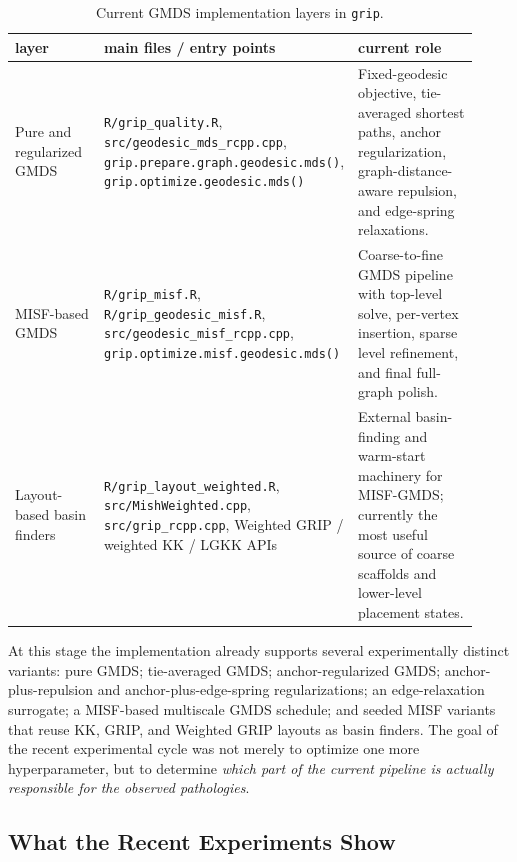 \documentclass[twoside,11pt]{article}
\begin{document}
\begin{table}[t]
  \centering
  \small
  \caption{Current GMDS implementation layers in \texttt{grip}.}
  \label{tab:implementation_layers}
  \begin{tabular}{p{0.23\linewidth} p{0.34\linewidth} p{0.35\linewidth}}
    \toprule
    layer & main files / entry points & current role \\
    \midrule
    Pure and regularized GMDS &
    \texttt{R/grip\_quality.R},
    \texttt{src/geodesic\_mds\_rcpp.cpp},
    \texttt{grip.prepare.graph.geodesic.mds()},
    \texttt{grip.optimize.geodesic.mds()} &
    Fixed-geodesic objective, tie-averaged shortest paths, anchor regularization, graph-distance-aware repulsion, and edge-spring relaxations. \\
    \addlinespace
    MISF-based GMDS &
    \texttt{R/grip\_misf.R},
    \texttt{R/grip\_geodesic\_misf.R},
    \texttt{src/geodesic\_misf\_rcpp.cpp},
    \texttt{grip.optimize.misf.geodesic.mds()} &
    Coarse-to-fine GMDS pipeline with top-level solve, per-vertex insertion, sparse level refinement, and final full-graph polish. \\
    \addlinespace
    Layout-based basin finders &
    \texttt{R/grip\_layout\_weighted.R},
    \texttt{src/MishWeighted.cpp},
    \texttt{src/grip\_rcpp.cpp},
    Weighted GRIP / weighted KK / LGKK APIs &
    External basin-finding and warm-start machinery for MISF-GMDS; currently the most useful source of coarse scaffolds and lower-level placement states. \\
    \bottomrule
  \end{tabular}
\end{table}

At this stage the implementation already supports several experimentally
distinct variants: pure GMDS; tie-averaged GMDS; anchor-regularized GMDS;
anchor-plus-repulsion and anchor-plus-edge-spring regularizations; an
edge-relaxation surrogate; a MISF-based multiscale GMDS schedule; and seeded
MISF variants that reuse KK, GRIP, and Weighted GRIP layouts as basin
finders.  The goal of the recent experimental cycle was not merely to optimize
one more hyperparameter, but to determine \emph{which part of the current
pipeline is actually responsible for the observed pathologies}.

\subsection{What the Recent Experiments Show}
\label{sec:recent_experiments}
\end{document}
